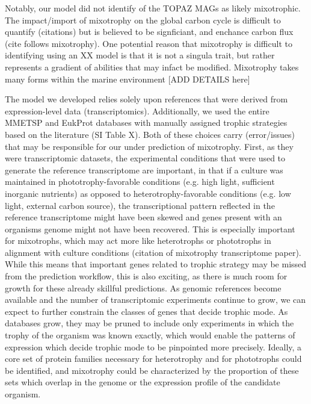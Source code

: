 \documentclass[12pt]{article}
\numberwithin{equation}{section}
\begin{document}
Notably, our model did not identify of the TOPAZ MAGs as likely mixotrophic. The  impact/import of mixotrophy on the global carbon cycle is difficult to quantify (citations) but is believed to be signficiant, and enchance carbon flux (cite follows mixotrophy). One potential reason that mixotrophy is difficult to identifying using an XX model is that it is not a singula trait, but rather represents a gradient of abilities that may infact be modified.  Mixotrophy takes many forms within the marine environment [ADD DETAILS here]

The model we developed relies solely upon references that were derived from expression-level data (transcriptomics). Additionally, we used the entire MMETSP \citep{Keeling2014} and EukProt \citep{Richter2020EukProt} databases with manually assigned trophic strategies based on the literature (SI Table X). Both of these choices carry (error/issues) that may be responsible for our under prediction of mixotrophy. First, as they were transcriptomic datasets, the experimental conditions that were used to generate the reference transcriptome are important, in that if a culture was maintained in phototrophy-favorable conditions (e.g. high light, sufficient inorganic nutrients) as opposed to heterotrophy-favorable conditions (e.g. low light, external carbon source), the transcriptional pattern reflected in the reference transcriptome might have been skewed and genes present with an organisms genome might not have been recovered. This is especially important for mixotrophs, which may act more like heterotrophs or phototrophs in alignment with culture conditions (citation of mixotrophy transcriptome paper). While this means that important genes related to trophic strategy may be missed from the prediction workflow, this is also exciting, as there is much room for growth for these already skillful predictions. As genomic references become available and the number of transcriptomic experiments continue to grow, we can expect to further constrain the classes of genes that decide trophic mode. As databases grow, they may be pruned to include only experiments in which the trophy of the organism was known exactly, which would enable the patterns of expression which decide trophic mode to be  pinpointed more precisely. Ideally, a core set of protein families necessary for heterotrophy and for phototrophs could be identified, and mixotrophy could be characterized by the proportion of these sets which overlap in the genome or the expression profile of the candidate organism.
\end{document}
